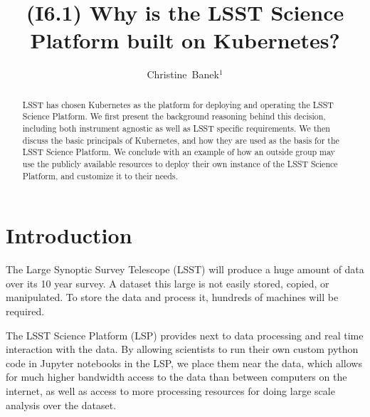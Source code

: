 \documentclass[11pt,twoside]{article}
\begin{document}
\title{(I6.1) Why is the LSST Science Platform built on Kubernetes?}


\author{Christine~Banek$^1$}





\newcommand{\code}[1]{\texttt{#1}}

\begin{abstract}
LSST has chosen Kubernetes as the platform for deploying and
operating the LSST Science Platform.  We first present the
background reasoning behind this decision, including both
instrument agnostic as well as LSST specific requirements.
We then discuss the basic principals of Kubernetes, and how
they are used as the basis for the LSST Science Platform.
We conclude with an example of how an outside group may
use the publicly available resources to deploy their own
instance of the LSST Science Platform, and customize it
to their needs.
\end{abstract}

\section{Introduction}

The Large Synoptic Survey Telescope (LSST) will produce a huge amount
of data over its 10 year survey. A dataset this large is not easily stored,
copied, or manipulated.  To store the data and process it, hundreds of
machines will be required.

The LSST Science Platform (LSP) provides next to data processing and real
time interaction with the data.  By allowing scientists to run their own
custom python code in Jupyter notebooks in the LSP, we place them near the data,
which allows for much higher bandwidth access to the data than between
computers on the internet, as well as access to more processing
resources for doing large scale analysis over the dataset.
\end{document}
